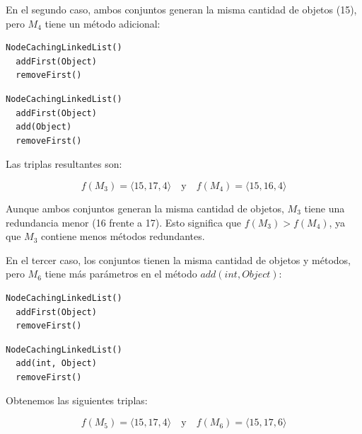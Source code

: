 En el segundo caso, ambos conjuntos generan la misma cantidad de objetos (15), pero \( M_4 \) tiene un método adicional:
\vspace{10pt} 

\begin{lstlisting}[numbers=none,label=fig:NCLbuilders3, caption=Conjunto de métodos \( M_3 \)]
  NodeCachingLinkedList()
  addFirst(Object)
  removeFirst()
\end{lstlisting}

\vspace{10pt} 

\begin{lstlisting}[numbers=none,label=fig:NCLbuilders4, caption=Conjunto de métodos \( M_4 \)]
  NodeCachingLinkedList()
  addFirst(Object)
  add(Object)
  removeFirst()
\end{lstlisting}


Las triplas resultantes son:

\[
f(M_3) = \langle 15, 17, 4 \rangle \quad \text{y} \quad f(M_4) = \langle 15, 16, 4 \rangle
\]

Aunque ambos conjuntos generan la misma cantidad de objetos, \( M_3 \) tiene una redundancia menor (16 frente a 17). Esto significa que \( f(M_3) > f(M_4) \), ya que \( M_3 \) contiene menos métodos redundantes.

En el tercer caso, los conjuntos tienen la misma cantidad de objetos y métodos, pero \( M_6 \) tiene más parámetros en el método \( add(int, Object) \):
\vspace{10pt} 

\begin{lstlisting}[numbers=none,label=fig:NCLbuilders5, caption=Conjunto de métodos \( M_5 \)]
  NodeCachingLinkedList()
  addFirst(Object)
  removeFirst()
\end{lstlisting}

\vspace{10pt} 

\begin{lstlisting}[numbers=none,label=fig:NCLbuilders6, caption=Conjunto de métodos \( M_6 \)]
  NodeCachingLinkedList()
  add(int, Object)
  removeFirst()
\end{lstlisting}

\vspace{10pt} 

Obtenemos las siguientes triplas:

\[
f(M_5) = \langle 15, 17, 4 \rangle \quad \text{y} \quad f(M_6) = \langle 15, 17, 6 \rangle
\]

